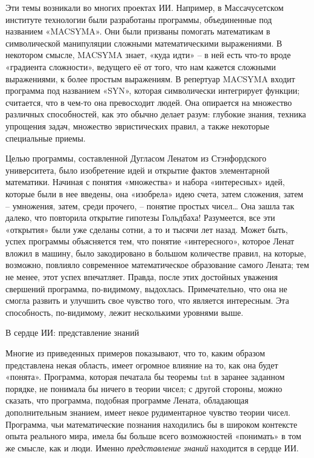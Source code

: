 \documentclass[../main.tex]{subfiles}
\begin{document}
Эти темы возникали во многих проектах ИИ\@. Например, в Массачусетском институте технологии были разработаны программы, объединенные под названием «MACSYMA». Они были призваны помогать математикам в символической манипуляции сложными математическими выражениями. В некотором смысле, MACSYMA знает, «куда идти» \--- в ней есть что-то вроде «градиента сложности», ведущего её от того, что нам кажется сложными выражениями, к более простым выражениям. В репертуар MACSYMA входит программа под названием «SYN», которая символически интегрирует функции; считается, что в чем-то она превосходит людей. Она опирается на множество различных способностей, как это обычно делает разум: глубокие знания, техника упрощения задач, множество эвристических правил, а также некоторые специальные приемы.

Целью программы, составленной Дугласом Ленатом из Стэнфордского университета, было изобретение идей и открытие фактов элементарной математики. Начиная с понятия «множества» и набора «интересных» идей, которые были в нее введены, она «изобрела» идею счета, затем сложения, затем \--- умножения, затем, среди прочего, \--- понятие простых чисел\ldots{} Она зашла так далеко, что повторила открытие гипотезы Гольдбаха! Разумеется, все эти «открытия» были уже сделаны сотни, а то и тысячи лет назад. Может быть, успех программы объясняется тем, что понятие «интересного», которое Ленат вложил в машину, было закодировано в большом количестве правил, на которые, возможно, повлияло современное математическое образование самого Лената; тем не менее, этот успех впечатляет. Правда, после этих достойных уважения свершений программа, по-видимому, выдохлась. Примечательно, что она не смогла развить и улучшить свое чувство того, что является интересным. Эта способность, по-видимому, лежит несколькими уровнями выше.

В сердце ИИ: представление знаний

Многие из приведенных примеров показывают, что то, каким образом представлена некая область, имеет огромное влияние на то, как она будет «понята». Программа, которая печатала бы теоремы \acs{tnt} в заранее заданном порядке, не понимала бы ничего в теории чисел; с другой стороны, можно сказать, что программа, подобная программе Лената, обладающая дополнительным знанием, имеет некое рудиментарное чувство теории чисел. Программа, чьи математические познания находились бы в широком контексте опыта реального мира, имела бы больше всего возможностей «понимать» в том же смысле, как и люди. Именно \emph{представление знаний} находится в сердце ИИ.
\end{document}
